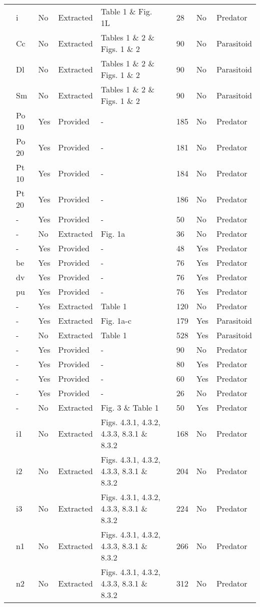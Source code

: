 \begin{longtable}{lllllllll}
\citet{Krylov:1992aa}&i&No&Extracted&Table 1 \& Fig. 1L&\citet{Novak:2020aa}&28&No&Predator\tabularnewline
\citet{Kumar:1985aa}&Cc&No&Extracted&Tables 1 \& 2 \& Figs. 1 \& 2&\citet{Novak:2020aa}&90&No&Parasitoid\tabularnewline
\citet{Kumar:1985aa}&Dl&No&Extracted&Tables 1 \& 2 \& Figs. 1 \& 2&\citet{Novak:2020aa}&90&No&Parasitoid\tabularnewline
\citet{Kumar:1985aa}&Sm&No&Extracted&Tables 1 \& 2 \& Figs. 1 \& 2&\citet{Novak:2020aa}&90&No&Parasitoid\tabularnewline
\citet{Lang:2012aa}&Po 10&Yes&Provided&-&\citet{Lang:2020aa}&185&No&Predator\tabularnewline
\citet{Lang:2012aa}&Po 20&Yes&Provided&-&\citet{Lang:2020aa}&181&No&Predator\tabularnewline
\citet{Lang:2012aa}&Pt 10&Yes&Provided&-&\citet{Lang:2020aa}&184&No&Predator\tabularnewline
\citet{Lang:2012aa}&Pt 20&Yes&Provided&-&\citet{Lang:2020aa}&186&No&Predator\tabularnewline
\citet{Long:2012aa}&-&Yes&Provided&-&\citet{Long:2020aa}&50&No&Predator\tabularnewline
\citet{Mansour:1991aa}&-&No&Extracted&Fig. 1a&\citet{Novak:2020aa}&36&No&Predator\tabularnewline
\citet{Medoc:2013aa}&-&Yes&Provided&-&&48&Yes&Predator\tabularnewline
\citet{Medoc:2015aa}&be&Yes&Provided&-&&76&Yes&Predator\tabularnewline
\citet{Medoc:2015aa}&dv&Yes&Provided&-&&76&Yes&Predator\tabularnewline
\citet{Medoc:2015aa}&pu&Yes&Provided&-&&76&Yes&Predator\tabularnewline
\citet{Mertz:1968aa}&-&Yes&Extracted&Table 1&\citet{Novak:2020aa}&120&No&Predator\tabularnewline
\citet{Mills:2004aa}&-&Yes&Extracted&Fig. 1a-c&\citet{Novak:2020aa}&179&Yes&Parasitoid\tabularnewline
\citet{Montoya:2000aa}&-&No&Extracted&Table 1&\citet{Novak:2020aa}&528&Yes&Parasitoid\tabularnewline
\citet{Omkar:2004aa}&-&Yes&Provided&-&&90&No&Predator\tabularnewline
\citet{Prokopenko:2017aa}&-&Yes&Provided&-&\citet{Prokopenko:2020aa}&80&Yes&Predator\tabularnewline
\citet{Pusack:2018aa}&-&Yes&Provided&-&\citet{Pusack:2020aa}&60&Yes&Predator\tabularnewline
\citet{Reeve:1997aa}&-&Yes&Provided&-&\citet{Reeve:2020aa}&26&No&Predator\tabularnewline
\citet{Salt:1974aa}&-&No&Extracted&Fig. 3 \& Table 1&\citet{Novak:2020aa}&50&Yes&Predator\tabularnewline
\citet{Uttley:1980aa}&i1&No&Extracted&Figs. 4.3.1, 4.3.2, 4.3.3, 8.3.1 \& 8.3.2&\citet{Novak:2020aa}&168&No&Predator\tabularnewline
\citet{Uttley:1980aa}&i2&No&Extracted&Figs. 4.3.1, 4.3.2, 4.3.3, 8.3.1 \& 8.3.2&\citet{Novak:2020aa}&204&No&Predator\tabularnewline
\citet{Uttley:1980aa}&i3&No&Extracted&Figs. 4.3.1, 4.3.2, 4.3.3, 8.3.1 \& 8.3.2&\citet{Novak:2020aa}&224&No&Predator\tabularnewline
\citet{Uttley:1980aa}&n1&No&Extracted&Figs. 4.3.1, 4.3.2, 4.3.3, 8.3.1 \& 8.3.2&\citet{Novak:2020aa}&266&No&Predator\tabularnewline
\citet{Uttley:1980aa}&n2&No&Extracted&Figs. 4.3.1, 4.3.2, 4.3.3, 8.3.1 \& 8.3.2&\citet{Novak:2020aa}&312&No&Predator\tabularnewline

\end{longtable}
